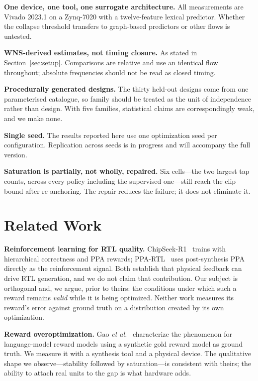 \documentclass[journal]{IEEEtran}
\begin{document}
\textbf{One device, one tool, one surrogate architecture.} All measurements are
Vivado 2023.1 on a Zynq-7020 with a twelve-feature lexical predictor. Whether
the collapse threshold transfers to graph-based predictors or other flows is
untested.

\textbf{WNS-derived estimates, not timing closure.} As stated in
Section~\ref{sec:setup}. Comparisons are relative and use an identical flow
throughout; absolute frequencies should not be read as closed timing.

\textbf{Procedurally generated designs.} The thirty held-out designs come from
one parameterised catalogue, so family should be treated as the unit of
independence rather than design. With five families, statistical claims are
correspondingly weak, and we make none.

\textbf{Single seed.} The results reported here use one optimization seed per
configuration. Replication across seeds is in progress and will accompany the
full version.

\textbf{Saturation is partially, not wholly, repaired.} Six cells---the two
largest tap counts, across every policy including the supervised
one---still reach the clip bound after re-anchoring. The repair reduces the
failure; it does not eliminate it.

\section{Related Work}
\label{sec:related}

\textbf{Reinforcement learning for RTL quality.} ChipSeek-R1~\cite{chipseek2025}
trains with hierarchical correctness and PPA rewards; PPA-RTL~\cite{ppartl2025}
uses post-synthesis PPA directly as the reinforcement signal. Both establish
that physical feedback can drive RTL generation, and we do not claim that
contribution. Our subject is orthogonal and, we argue, prior to theirs: the
conditions under which such a reward remains \emph{valid} while it is being
optimized. Neither work measures its reward's error against ground truth on a
distribution created by its own optimization.

\textbf{Reward overoptimization.} Gao \emph{et al.}~\cite{gao2023scaling}
characterize the phenomenon for language-model reward models using a synthetic
gold reward model as ground truth. We measure it with a synthesis tool and a
physical device. The qualitative shape we observe---stability followed by
saturation---is consistent with theirs; the ability to attach real units to the
gap is what hardware adds.
\end{document}
